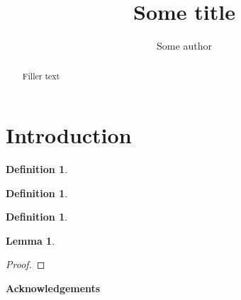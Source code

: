 \documentclass[a4paper]{amsart}
\title{Some title}
\author{Some author}
\newtheorem{lemma}[theorem]{Lemma}
\theoremstyle{remark}
\theoremstyle{definition}
\newtheorem{definition}[theorem]{Definition}
\begin{document}
\begin{abstract}
    Filler text
\end{abstract}

\maketitle

\section{Introduction}


\begin{definition}
    
\end{definition}

\begin{definition}
    
\end{definition}

\begin{definition}
    
\end{definition}


\begin{lemma}
    
\end{lemma}

\begin{proof}
    
\end{proof}

\textbf{Acknowledgements}

\section{}





\end{document}
